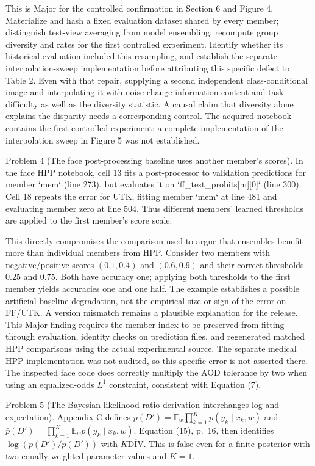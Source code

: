 \documentclass[10pt]{article}
\begin{document}
This is Major for the controlled confirmation in Section 6 and Figure 4. Materialize and hash a fixed evaluation dataset shared by every member; distinguish test-view averaging from model ensembling; recompute group diversity and rates for the first controlled experiment. Identify whether its historical evaluation included this resampling, and establish the separate interpolation-sweep implementation before attributing this specific defect to Table 2. Even with that repair, supplying a second independent class-conditional image and interpolating it with noise change information content and task difficulty as well as the diversity statistic. A causal claim that diversity alone explains the disparity needs a corresponding control. The acquired notebook contains the first controlled experiment; a complete implementation of the interpolation sweep in Figure 5 was not established.\par
Problem 4 (The face post-processing baseline uses another member’s scores).  In the face HPP notebook, cell 13 fits a post-processor to validation predictions for member `mem` (line 273), but evaluates it on `ff\_test\_probits[m][0]` (line 300). Cell 18 repeats the error for UTK, fitting member `mem` at line 481 and evaluating member zero at line 504. Thus different members’ learned thresholds are applied to the first member’s score scale.\par
This directly compromises the comparison used to argue that ensembles benefit more than individual members from HPP. Consider two members with negative/positive scores \((0.1,0.4)\) and \((0.6,0.9)\) and their correct thresholds \(0.25\) and \(0.75\). Both have accuracy one; applying both thresholds to the first member yields accuracies one and one half. The example establishes a possible artificial baseline degradation, not the empirical size or sign of the error on FF/UTK. A version mismatch remains a plausible explanation for the release. This Major finding requires the member index to be preserved from fitting through evaluation, identity checks on prediction files, and regenerated matched HPP comparisons using the actual experimental source. The separate medical HPP implementation was not audited, so this specific error is not asserted there. The inspected face code does correctly multiply the AOD tolerance by two when using an equalized-odds \(L^1\) constraint, consistent with Equation (7).\par
Problem 5 (The Bayesian likelihood-ratio derivation interchanges log and expectation).  Appendix C defines \(p(D')=\mathbb E_w\prod_{k=1}^K p(y_k\mid x_k,w)\) and \(\bar p(D')=\prod_{k=1}^K\mathbb E_w p(y_k\mid x_k,w)\). Equation (15), p. 16, then identifies \(\log(\bar p(D')/p(D'))\) with \(K\overline{\mathrm{DIV}}\). This is false even for a finite posterior with two equally weighted parameter values and \(K=1\).\par
\end{document}
